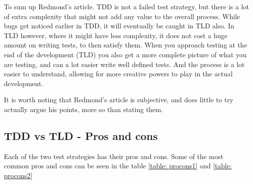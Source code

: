To sum up Redmond’s article. TDD is not a failed test strategy, but there is a lot of extra complexity that might not add any value to the overall process. While bugs get noticed earlier in TDD, it will eventually be caught in TLD also. In TLD however, where it might have less complexity, it does not cost a huge amount on writing tests, to then satisfy them. When you approach testing at the end of the development (TLD) you also get a more complete picture of what you are testing, and can a lot easier write well defined tests. And the process is a lot easier to understand, allowing for more creative powers to play in the actual development.
 
It is worth noting that Redmond’s article is subjective, and does little to try actually argue his points, more so than stating them.  
\subsection{TDD vs TLD - Pros and cons} 

Each of the two test strategies has their pros and cons. Some of the most common pros and cons can be seen 
in the table
\ref{table: procons1} and  \ref{table: procons2} ~\cite{sh2015}~\cite{sr2019}
\begin{center}

\end{center}





